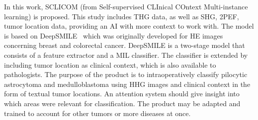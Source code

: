 In this work, SCLICOM (from Self-supervised CLInical COntext Multi-instance learning) is proposed.
This study includes THG data, as well as SHG, 2PEF, tumor location data, providing an AI with more context to work with.
The model is based on DeepSMILE~ which was originally developed for HE images concerning breast and colorectal cancer.
DeepSMILE is a two-stage model that consists of a feature extractor and a MIL classifier.
The classifier is extended by including tumor location as clinical context, which is also available to pathologists.
The purpose of the product is to intraoperatively classify pilocytic astrocytoma and medulloblastoma using HHG images and clinical context in the form of textual tumor locations.
An attention system should give insight into which areas were relevant for classification.
The product may be adapted and trained to account for other tumors or more diseases at once.
